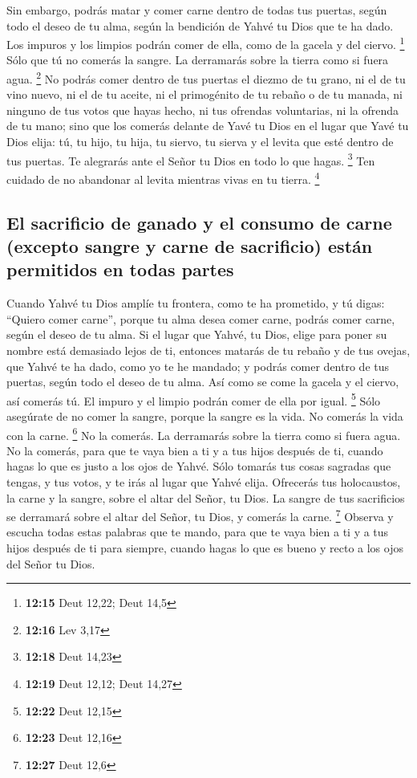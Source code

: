  Sin embargo, podrás matar y comer carne dentro de todas
tus puertas, según todo el deseo de tu alma, según la bendición de Yahvé
tu Dios que te ha dado. Los impuros y los limpios podrán comer de ella,
como de la gacela y del ciervo. \footnote{\textbf{12:15} Deut 12,22;
  Deut 14,5}  Sólo que tú no comerás la sangre. La
derramarás sobre la tierra como si fuera agua. \footnote{\textbf{12:16}
  Lev 3,17}  No podrás comer dentro de tus puertas el
diezmo de tu grano, ni el de tu vino nuevo, ni el de tu aceite, ni el
primogénito de tu rebaño o de tu manada, ni ninguno de tus votos que
hayas hecho, ni tus ofrendas voluntarias, ni la ofrenda de tu mano;
 sino que los comerás delante de Yavé tu Dios en el lugar
que Yavé tu Dios elija: tú, tu hijo, tu hija, tu siervo, tu sierva y el
levita que esté dentro de tus puertas. Te alegrarás ante el Señor tu
Dios en todo lo que hagas. \footnote{\textbf{12:18} Deut 14,23}
 Ten cuidado de no abandonar al levita mientras vivas en
tu tierra. \footnote{\textbf{12:19} Deut 12,12; Deut 14,27}

\hypertarget{el-sacrificio-de-ganado-y-el-consumo-de-carne-excepto-sangre-y-carne-de-sacrificio-estuxe1n-permitidos-en-todas-partes}{%
\subsection{El sacrificio de ganado y el consumo de carne (excepto
sangre y carne de sacrificio) están permitidos en todas
partes}\label{el-sacrificio-de-ganado-y-el-consumo-de-carne-excepto-sangre-y-carne-de-sacrificio-estuxe1n-permitidos-en-todas-partes}}

 Cuando Yahvé tu Dios amplíe tu frontera, como te ha
prometido, y tú digas: ``Quiero comer carne'', porque tu alma desea
comer carne, podrás comer carne, según el deseo de tu alma.
 Si el lugar que Yahvé, tu Dios, elige para poner su
nombre está demasiado lejos de ti, entonces matarás de tu rebaño y de
tus ovejas, que Yahvé te ha dado, como yo te he mandado; y podrás comer
dentro de tus puertas, según todo el deseo de tu alma. 
Así como se come la gacela y el ciervo, así comerás tú. El impuro y el
limpio podrán comer de ella por igual. \footnote{\textbf{12:22} Deut
  12,15}  Sólo asegúrate de no comer la sangre, porque la
sangre es la vida. No comerás la vida con la carne. \footnote{\textbf{12:23}
  Deut 12,16}  No la comerás. La derramarás sobre la
tierra como si fuera agua.  No la comerás, para que te
vaya bien a ti y a tus hijos después de ti, cuando hagas lo que es justo
a los ojos de Yahvé.  Sólo tomarás tus cosas sagradas que
tengas, y tus votos, y te irás al lugar que Yahvé elija. 
Ofrecerás tus holocaustos, la carne y la sangre, sobre el altar del
Señor, tu Dios. La sangre de tus sacrificios se derramará sobre el altar
del Señor, tu Dios, y comerás la carne. \footnote{\textbf{12:27} Deut
  12,6}  Observa y escucha todas estas palabras que te
mando, para que te vaya bien a ti y a tus hijos después de ti para
siempre, cuando hagas lo que es bueno y recto a los ojos del Señor tu
Dios.


